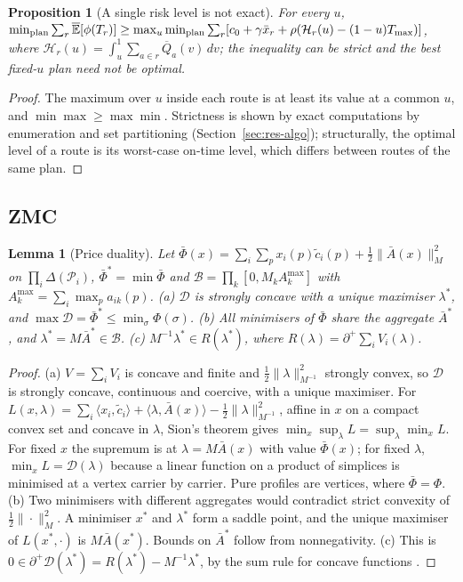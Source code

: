 \documentclass[preprint,12pt]{elsarticle}
\newtheorem{lemma}[theorem]{Lemma}
\newtheorem{proposition}[theorem]{Proposition}
\theoremstyle{definition}
\theoremstyle{remark}
\newcommand{\cP}{\mathcal{P}}
\newcommand{\Abar}{\bar A}
\newcommand{\Amax}{A^{\max}}
\newcommand{\Eu}{\overline{\mathbb{E}}}
\newcommand{\Qb}{\overline{Q}}
\newcommand{\xb}{\bar x}
\newcommand{\ip}[2]{\langle #1,#2\rangle}
\newcommand{\sd}{\partial^{+}}
\begin{document}
\begin{proposition}[A single risk level is not exact]\label{prop:fixedu}
For every $u$, $\min_{\rm plan}\sum_r\Eu[\phi(T_r)]\ge\max_u\min_{\rm plan}\sum_r[c_0+\gamma\xb_r+\rho(\mathcal H_r(u)-(1-u)T_{\max})]$, where $\mathcal H_r(u)=\int_u^1\sum_{a\in r}\Qb_a(v)\,dv$; the inequality can be strict and the best fixed-$u$ plan need not be optimal.
\end{proposition}
\begin{proof}
The maximum over $u$ inside each route is at least its value at a common $u$, and $\min\max\ge\max\min$. Strictness is shown by exact computations by enumeration and set partitioning (Section~\ref{sec:res-algo}); structurally, the optimal level of a route is its worst-case on-time level, which differs between routes of the same plan.
\end{proof}

\subsection{ZMC}

\begin{lemma}[Price duality]\label{lem:dual}
Let $\bar\Phi(x)=\sum_i\sum_px_i(p)\tilde c_i(p)+\tfrac12\|\Abar(x)\|_M^2$ on $\prod_i\Delta(\cP_i)$, $\bar\Phi^*=\min\bar\Phi$ and $\mathcal B=\prod_k[0,M_k\Amax_k]$ with $\Amax_k=\sum_i\max_pa_{ik}(p)$. (a) $\mathcal D$ is strongly concave with a unique maximiser $\lambda^*$, and $\max\mathcal D=\bar\Phi^*\le\min_\sigma\Phi(\sigma)$. (b) All minimisers of $\bar\Phi$ share the aggregate $\Abar^*$, and $\lambda^*=M\Abar^*\in\mathcal B$. (c) $M^{-1}\lambda^*\in R(\lambda^*)$, where $R(\lambda)=\sd\sum_iV_i(\lambda)$.
\end{lemma}
\begin{proof}
(a) $V=\sum_iV_i$ is concave and finite and $\tfrac12\|\lambda\|^2_{M^{-1}}$ strongly convex, so $\mathcal D$ is strongly concave, continuous and coercive, with a unique maximiser. For $L(x,\lambda)=\sum_i\ip{x_i}{\tilde c_i}+\ip{\lambda}{\Abar(x)}-\tfrac12\|\lambda\|^2_{M^{-1}}$, affine in $x$ on a compact convex set and concave in $\lambda$, Sion's theorem gives $\min_x\sup_\lambda L=\sup_\lambda\min_xL$. For fixed $x$ the supremum is at $\lambda=M\Abar(x)$ with value $\bar\Phi(x)$; for fixed $\lambda$, $\min_xL=\mathcal D(\lambda)$ because a linear function on a product of simplices is minimised at a vertex carrier by carrier. Pure profiles are vertices, where $\bar\Phi=\Phi$. (b) Two minimisers with different aggregates would contradict strict convexity of $\tfrac12\|\cdot\|_M^2$. A minimiser $x^*$ and $\lambda^*$ form a saddle point, and the unique maximiser of $L(x^*,\cdot)$ is $M\Abar(x^*)$. Bounds on $\Abar^*$ follow from nonnegativity. (c) This is $0\in\sd\mathcal D(\lambda^*)=R(\lambda^*)-M^{-1}\lambda^*$, by the sum rule for concave functions \citep{Rockafellar1970}.
\end{proof}
\end{document}
